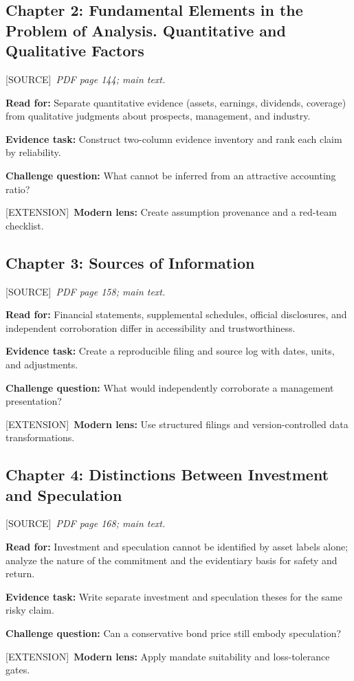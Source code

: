\documentclass[11pt,letterpaper]{article}
\newcommand{\src}{\textsf{\color{sea}[SOURCE]}}
\newcommand{\ext}{\textsf{\color{gold}[EXTENSION]}}
\begin{document}
\subsection{Chapter 2: Fundamental Elements in the Problem of Analysis. Quantitative and Qualitative Factors}
\src\ \textit{PDF page 144; main text.}\par
\textbf{Read for:} Separate quantitative evidence (assets, earnings, dividends, coverage) from qualitative judgments about prospects, management, and industry.\par
\textbf{Evidence task:} Construct two-column evidence inventory and rank each claim by reliability.\par
\textbf{Challenge question:} What cannot be inferred from an attractive accounting ratio?\par
\ext\ \textbf{Modern lens:} Create assumption provenance and a red-team checklist.\par

\subsection{Chapter 3: Sources of Information}
\src\ \textit{PDF page 158; main text.}\par
\textbf{Read for:} Financial statements, supplemental schedules, official disclosures, and independent corroboration differ in accessibility and trustworthiness.\par
\textbf{Evidence task:} Create a reproducible filing and source log with dates, units, and adjustments.\par
\textbf{Challenge question:} What would independently corroborate a management presentation?\par
\ext\ \textbf{Modern lens:} Use structured filings and version-controlled data transformations.\par

\subsection{Chapter 4: Distinctions Between Investment and Speculation}
\src\ \textit{PDF page 168; main text.}\par
\textbf{Read for:} Investment and speculation cannot be identified by asset labels alone; analyze the nature of the commitment and the evidentiary basis for safety and return.\par
\textbf{Evidence task:} Write separate investment and speculation theses for the same risky claim.\par
\textbf{Challenge question:} Can a conservative bond price still embody speculation?\par
\ext\ \textbf{Modern lens:} Apply mandate suitability and loss-tolerance gates.\par
\end{document}
